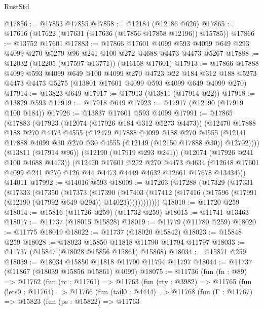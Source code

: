 \begin{lexlean}{RustStd}
\begin{coremodule}
@17856 := @17853 @17855
@17858 := @12184 (@12186 @626)
@17865 := @17616 (@17622 (@17631 (@17636 (@17856 @17858 @12196)) @15785))
@17866 := @13752 @17601
@17883 := @17866
    @17601
    @4099
    @593
    @4099
    @649
    @293
    @4099
    @270
    @5279
    @96
    @241
    @100
    @272
    @4688
    @4473
    @4473
    @5267
@17888 := @12032 (@12205 (@17597 @13771)) (@16158 @17601)
@17913 := @17866
    @17888
    @4099
    @593
    @4099
    @649
    @100
    @4099
    @270
    @4723
    @22
    @184
    @312
    @188
    @5273
    @4473
    @4473
    @5275
    (@13801 @17601 @4099 @593 @4099 @649 @4099 @270)
@17914 := @13823 @649
@17917 := @17913 (@13811 (@17914 @22))
@17918 := @13829 @593
@17919 := @17918 @649
@17923 := @17917 (@12190 (@17919 @100 @184))
@17926 := @13837 @17601 @593 @4099
@17991 := @17865
    (@17883
      (@17923
        (@12074 (@17926 @184 @312 @5273 @4473))
        (@12470
          @17888
          @188
          @270
          @4473
          @4555
          (@12479
            @17888
            @4099
            @188
            @270
            @4555
            (@12141 @17888 @4099 @30 @270 @30 @4555 (@12149 (@12150 @17888 @30)) @12702))))
      (@13811 (@17914 @96))
      (@12190 (@17919 @293 @241))
      (@12074 (@17926 @241 @100 @4688 @4473))
      (@12470
        @17601
        @272
        @270
        @4473
        @4634
        (@12648 @17601 @4099 @241 @270 @126 @44 @4473 @4449 @4632 @12661 @17678 @13434)))
    @14011
@17992 := @14016 @593
@18009 := @17263
    (@17288
      (@17329
        (@17331
          (@17333
            (@17350
              (@17373
                (@17390
                  (@17403
                    (@17412 (@17416 (@17596 (@17991 (@12190 (@17992 @649 @294)) @14023))))))))))))
@18010 := @11720 @259
@18014 := @15816 (@11726 @259) (@11732 @259)
@18015 := @11741 @13463
@18017 := @11737 (@18015 @15828)
@18019 := @11779 (@11780 @259)
@18020 := @11775 @18019
@18022 := @11737 (@18020 @15842)
@18023 := @15848 @259
@18028 := @18023 @15850 @11818 @11790 @11794 @11797
@18033 := @11737 (@15847 (@18028 @15856 @15861) @15868)
@18034 := @15871 @259
@18039 := @18034 @15850 @11818 @11790 @11794 @11797
@18044 := @11737 (@11867 (@18039 @15856 @15861) @4099)
@18075 := @11736
    (fun (fn : @89) =>
    @11762
      (fun (rc : @11761) =>
      @11763
        (fun (rty : @3982) =>
        @11765
          (fun (lets0 : @11764) =>
          @11766
            (fun (tail0 : @4444) =>
            @11768
              (fun (Γ : @11767) =>
              @15823
                (fun (ps : @15822) =>
                @11763

\end{coremodule}
\end{lexlean}
